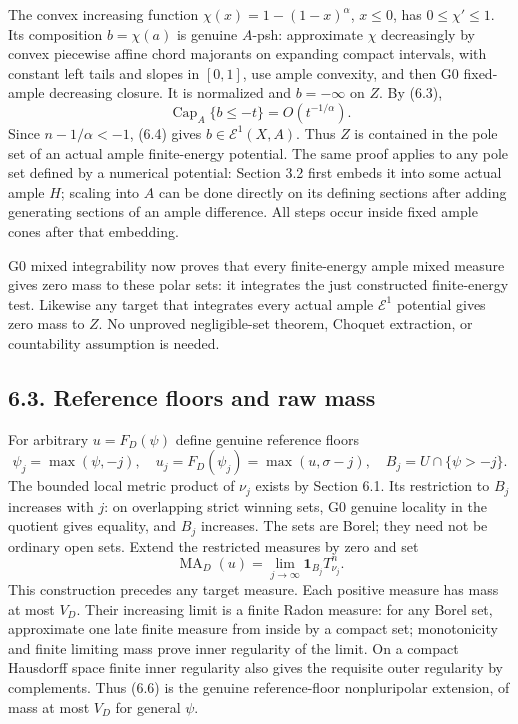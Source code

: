 \documentclass[
  10pt,
]{article}
\begin{document}
The convex increasing function \(\chi(x)=1-(1-x)^\alpha\), \(x\leq0\),
has \(0\leq\chi'\leq1\). Its composition \(b=\chi(a)\) is genuine
\(A\)-psh: approximate \(\chi\) decreasingly by convex piecewise affine
chord majorants on expanding compact intervals, with constant left tails
and slopes in \([0,1]\), use ample convexity, and then G0 fixed-ample
decreasing closure. It is normalized and \(b=-\infty\) on \(Z\). By
(6.3), \[\operatorname{Cap}_A\{b\leq-t\}=O(t^{-1/\alpha}).\] Since
\(n-1/\alpha<-1\), (6.4) gives \(b\in\mathcal E^1(X,A)\). Thus \(Z\) is
contained in the pole set of an actual ample finite-energy potential.
The same proof applies to any pole set defined by a numerical potential:
Section 3.2 first embeds it into some actual ample \(H\); scaling into
\(A\) can be done directly on its defining sections after adding
generating sections of an ample difference. All steps occur inside fixed
ample cones after that embedding.

G0 mixed integrability now proves that every finite-energy ample mixed
measure gives zero mass to these polar sets: it integrates the just
constructed finite-energy test. Likewise any target that integrates
every actual ample \(\mathcal E^1\) potential gives zero mass to \(Z\).
No unproved negligible-set theorem, Choquet extraction, or countability
assumption is needed.

\subsection{6.3. Reference floors and raw
mass}\label{reference-floors-and-raw-mass}

For arbitrary \(u=F_D(\psi)\) define genuine reference floors
\[\psi_j=\max(\psi,-j),\quad
u_j=F_D(\psi_j)=\max(u,\sigma-j),\quad
B_j=U\cap\{\psi>-j\}.\tag{6.5}\] The bounded local metric product of
\(\nu_j\) exists by Section 6.1. Its restriction to \(B_j\) increases
with \(j\): on overlapping strict winning sets, G0 genuine locality in
the quotient gives equality, and \(B_j\) increases. The sets are Borel;
they need not be ordinary open sets. Extend the restricted measures by
zero and set
\[\operatorname{MA}_D(u)=\lim_{j\to\infty}\mathbf1_{B_j}T_{\nu_j}^n.\tag{6.6}\]
This construction precedes any target measure. Each positive measure has
mass at most \(V_D\). Their increasing limit is a finite Radon measure:
for any Borel set, approximate one late finite measure from inside by a
compact set; monotonicity and finite limiting mass prove inner
regularity of the limit. On a compact Hausdorff space finite inner
regularity also gives the requisite outer regularity by complements.
Thus (6.6) is the genuine reference-floor nonpluripolar extension, of
mass at most \(V_D\) for general \(\psi\).
\end{document}
